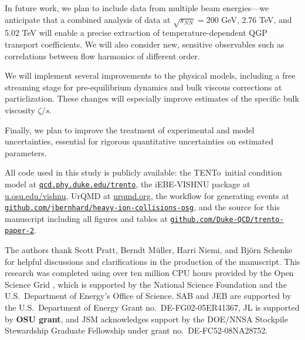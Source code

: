 \documentclass[aps,prc,reprint,amsmath,nofootinbib]{revtex4-1}
\newcommand{\trento}{T\raisebox{-0.5ex}{R}ENTo}
\newcommand{\sqrts}{\sqrt{s_{NN}}}
\begin{document}

In future work, we plan to include data from multiple beam energies---we anticipate that a combined analysis of data at $\sqrts = 200$ GeV, 2.76 TeV, and 5.02 TeV will enable a precise extraction of temperature-dependent QGP transport coefficients.
We will also consider new, sensitive observables such as correlations between flow harmonics of different order.

We will implement several improvements to the physical models, including a free streaming stage for pre-equilibrium dynamics and bulk viscous corrections at particlization.
These changes will especially improve estimates of the specific bulk viscosity $\zeta/s$.

Finally, we plan to improve the treatment of experimental and model uncertainties, essential for rigorous quantitative uncertainties on estimated parameters.

\vspace*{\baselineskip}

\newcommand{\nicelink}[2][http]{\mbox{\href{#1://#2}{\nolinkurl{#2}}}}

All code used in this study is publicly available:
the \trento\ initial condition model at \nicelink{qcd.phy.duke.edu/trento},
the iEBE-VISHNU package at \url{u.osu.edu/vishnu},
UrQMD at \url{urqmd.org},
the workflow for generating events at \nicelink[https]{github.com/jbernhard/heavy-ion-collisions-osg},
and the source for this manuscript including all figures and tables at \nicelink[https]{github.com/Duke-QCD/trento-paper-2}.

\begin{acknowledgments}
The authors thank Scott Pratt, Berndt M\"uller, Harri Niemi, and Bj\"orn Schenke for helpful discussions and clarifications in the production of the manuscript.
This research was completed using over ten million CPU hours provided by the Open Science Grid \cite{Pordes:2007zzb,Sfiligoi:2010zz}, which is supported by the National Science Foundation and the U.S.\ Department of Energy's Office of Science.
SAB and JEB are supported by the U.S.\ Department of Energy Grant no.~DE-FG02-05ER41367,
JL is supported by {\bf OSU grant},
and JSM acknowledges support by the DOE/NNSA Stockpile Stewardship Graduate Fellowship under grant no.~DE-FC52-08NA28752.
\end{acknowledgments}


\end{document}
